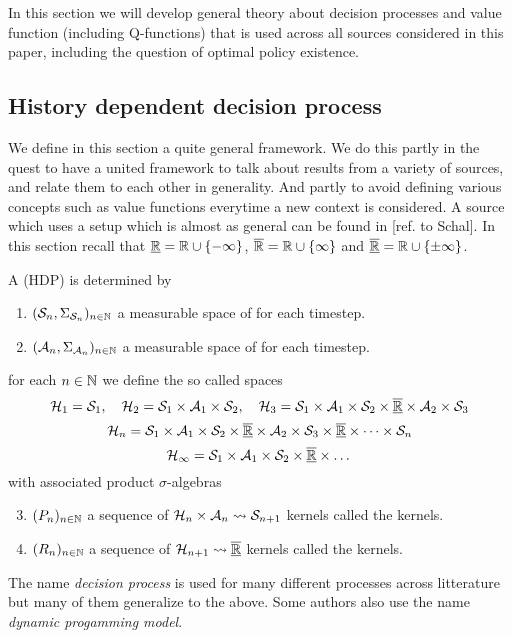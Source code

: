 
In this section we will develop general theory about
decision processes and value function (including Q-functions)
that is used across all sources considered in this paper,
including the question of optimal policy existence.

\subsection{History dependent decision process}
We define in this section a quite general framework.
We do this partly in the quest to have a united framework
to talk about results from a variety of sources,
and relate them to each other in generality.
And partly to avoid defining various concepts such as value functions
everytime a new context is considered.
A source which uses a setup which is almost as general can be found in
[ref. to Schal].
In this section recall that $\underline{\mathbb{R}} = \mathbb{R} \cup \{-\infty\}$,
$\overline{\mathbb{R}} = \mathbb{R} \cup \{\infty\}$ and
$\overline{\underline{\mathbb{R}}} = \mathbb{R} \cup \{\pm \infty\}$.

\begin{defn}
  A  (HDP) is determined by
  \begin{enumerate}
    \item $(\mathcal{S}_n, \Sigma_{\mathcal{S}_n})_{n \in \mathbb{N}}$ a 
      measurable space of  for each timestep.
    \item $(\mathcal{A}_n, \Sigma_{\mathcal{A}_n})_{n \in \mathbb{N}}$ a 
      measurable space of  for each timestep.
  \end{enumerate}
  for each $n \in \mathbb{N}$ we define the so called  spaces
  \[ \mathcal{H}_1 = \mathcal{S}_1, \quad
    \mathcal{H}_2 = \mathcal{S}_1\times \mathcal{A}_1\times \mathcal{S}_2,
    \quad \mathcal{H}_3 = \mathcal{S}_1 \times \mathcal{A}_1 \times \mathcal{S}_2 \times
  \overline{\underline{\mathbb{R}}} \times \mathcal{A}_2 \times \mathcal{S}_3 \]
  \[ \mathcal{H}_n = \mathcal{S}_1 \times \mathcal{A}_1
    \times \mathcal{S}_2 \times \overline{\underline{\mathbb{R}}} \times \mathcal{A}_2
  \times \mathcal{S}_3 \times \overline{\underline{\mathbb{R}}}\times \dots \times \mathcal{S}_n \]
  \[
    \mathcal{H}_\infty = \mathcal{S}_1 \times \mathcal{A}_1 \times \mathcal{S}_2 \times
    \overline{\underline{\mathbb{R}}} \times \dots
  \]
  with associated product $\sigma$-algebras
  \begin{enumerate} \setcounter{enumi}{2}
    \item $(P_n)_{n \in \mathbb{N}}$ a sequence of
      $\mathcal{H}_n \times \mathcal{A}_n \leadsto \mathcal{S}_{n+1}$ kernels
      called the  kernels.
    \item $(R_n)_{n \in \mathbb{N}}$ a sequence of
      $\mathcal{H}_{n+1} \leadsto \overline{\underline{\mathbb{R}}}$ kernels
      called the  kernels.
  \end{enumerate}
  \label{sett:HDP}
\end{defn}
The name \emph{decision process} is used for many different processes
across litterature but many of them generalize to the above.
Some authors also use the name \emph{dynamic progamming model}.

